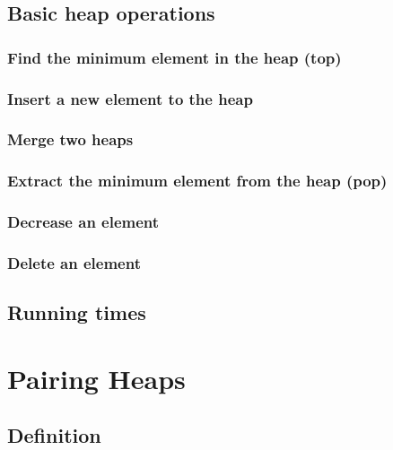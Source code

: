 \documentclass{article}
\begin{document}
\subsection{Basic heap operations}

\subsubsection{Find the minimum element in the heap (top)}

\subsubsection{Insert a new element to the heap}

\subsubsection{Merge two heaps}

\subsubsection{Extract the minimum element from the heap (pop)}

\subsubsection{Decrease an element}

\subsubsection{Delete an element}

\subsection{Running times}



\section{Pairing Heaps}
\label{pairing-heap}

\subsection{Definition}
\end{document}
